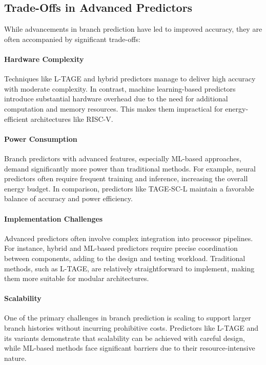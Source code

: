 \documentclass[10pt,journal,compsoc]{IEEEtran}
\begin{document}
\subsection*{Trade-Offs in Advanced Predictors}

While advancements in branch prediction have led to improved accuracy, they are often accompanied by significant trade-offs:

\paragraph*{Hardware Complexity} Techniques like L-TAGE and hybrid predictors manage to deliver high accuracy with moderate complexity. In contrast, machine learning-based predictors introduce substantial hardware overhead due to the need for additional computation and memory resources. This makes them impractical for energy-efficient architectures like RISC-V.

\paragraph*{Power Consumption} Branch predictors with advanced features, especially ML-based approaches, demand significantly more power than traditional methods. For example, neural predictors often require frequent training and inference, increasing the overall energy budget. In comparison, predictors like TAGE-SC-L maintain a favorable balance of accuracy and power efficiency.

\paragraph*{Implementation Challenges} Advanced predictors often involve complex integration into processor pipelines. For instance, hybrid and ML-based predictors require precise coordination between components, adding to the design and testing workload. Traditional methods, such as L-TAGE, are relatively straightforward to implement, making them more suitable for modular architectures.

\paragraph*{Scalability} One of the primary challenges in branch prediction is scaling to support larger branch histories without incurring prohibitive costs. Predictors like L-TAGE and its variants demonstrate that scalability can be achieved with careful design, while ML-based methods face significant barriers due to their resource-intensive nature.
\end{document}
